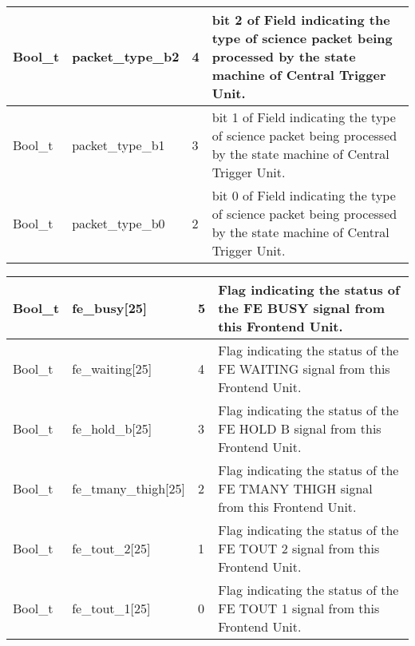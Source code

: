 \documentclass[a4paper, 12pt, onecolumn]{article}
\begin{document}
\begin{center}
\begin{supertabular}{| p{15mm} | p{37mm} | p{7mm} | p{60mm} |}
    Bool\_t   & packet\_type\_b2        & 4   & bit 2 of Field indicating the type of science packet being processed by the state machine of Central Trigger Unit. \\\hline
    Bool\_t   & packet\_type\_b1        & 3   & bit 1 of Field indicating the type of science packet being processed by the state machine of Central Trigger Unit. \\\hline
    Bool\_t   & packet\_type\_b0        & 2   & bit 0 of Field indicating the type of science packet being processed by the state machine of Central Trigger Unit. \\
  \end{supertabular}
\end{center}

\begin{center}
  \label{tab:trig-sig-con-bit}    
  \tablelasttail{\hline}
  \begin{supertabular}{| p{15mm} | p{34mm} | p{7mm} | p{63mm} |}
    Bool\_t   & fe\_busy[25]         & 5  & Flag indicating the status of the FE BUSY signal from this Frontend Unit. \\\hline
    Bool\_t   & fe\_waiting[25]      & 4  & Flag indicating the status of the FE WAITING signal from this Frontend Unit. \\\hline
    Bool\_t   & fe\_hold\_b[25]      & 3  & Flag indicating the status of the FE HOLD B signal from this Frontend Unit. \\\hline
    Bool\_t   & fe\_tmany\_thigh[25] & 2  & Flag indicating the status of the FE TMANY THIGH signal from this Frontend Unit. \\\hline
    Bool\_t   & fe\_tout\_2[25]      & 1  & Flag indicating the status of the FE TOUT 2 signal from this Frontend Unit. \\\hline
    Bool\_t   & fe\_tout\_1[25]      & 0  & Flag indicating the status of the FE TOUT 1 signal from this Frontend Unit. \\
  \end{supertabular}
\end{center}
\end{document}
